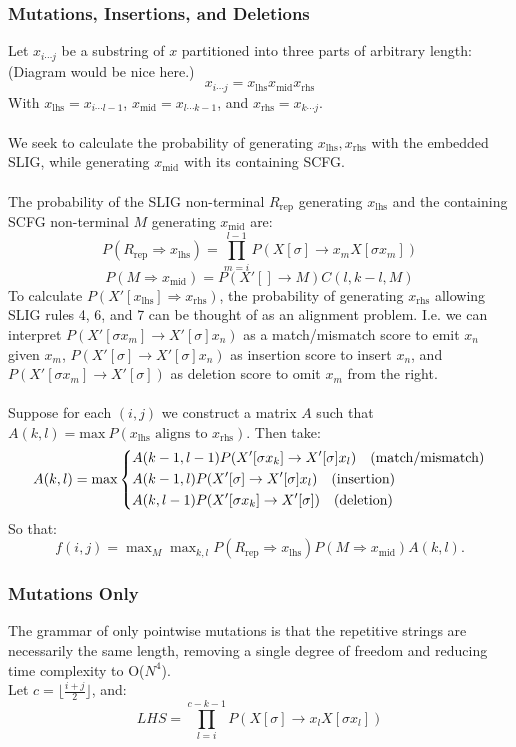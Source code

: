 \documentclass[11pt]{article}
\begin{document}
\subsubsection {Mutations, Insertions, and Deletions}
Let $x_{i \cdots j}$ be a substring of $x$ partitioned into three parts of arbitrary length: (Diagram would be nice here.)\\
\[
 x_{i \cdots j} = x_\text{lhs} x_\text{mid} x_\text{rhs}
\]
With $x_\text{lhs} = x_{i \cdots l-1}$, $x_\text{mid} = x_{l \cdots k-1}$, and $x_\text{rhs} = x_{k \cdots j}$.\\ \\
We seek to calculate the probability of generating $x_\text{lhs}, x_\text{rhs}$ with the embedded SLIG,
while generating $x_\text{mid}$ with its containing SCFG. \\ \\
The probability of the SLIG non-terminal $R_\text{rep}$ generating $x_\text{lhs}$ and the
containing SCFG non-terminal $M$ generating $x_\text{mid}$ are:
\[
 P(R_\text{rep} \Rightarrow x_\text{lhs}) = \prod_{m=i}^{l-1}P(X[\sigma] \rightarrow x_m X[\sigma x_m])
\]
\[
 P(M \Rightarrow x_\text{mid}) = P(X'[] \rightarrow M) C(l, k-l, M) 
\]
To calculate $P(X'[x_\text{lhs}] \Rightarrow x_\text{rhs})$, the probability of generating
$x_\text{rhs}$ allowing SLIG rules 4, 6, and 7 can be thought of as an alignment problem.
I.e. we can interpret $P(X'[\sigma x_m] \rightarrow X'[\sigma]x_n)$ as a match/mismatch score to
emit $x_n$ given $x_m$, $P(X'[\sigma] \rightarrow X'[\sigma]x_n)$ as insertion score to insert $x_n$,
and $P(X'[\sigma x_m] \rightarrow X'[\sigma])$ as deletion score to omit $x_m$ from the right. \\ \\
Suppose for each $(i, j)$ we construct a matrix $A$ such that $A(k, l) = \text{max} \ P(x_{\text{lhs}} \text{ aligns to } x_{\text{rhs}})$.
Then take:
\[
A(k, l) = \mbox{max}
  \begin{dcases}
  A(k-1, l-1) P(X'[\sigma x_k] \rightarrow X'[\sigma]x_l) \ \ \text{ (match/mismatch)}\\
  A(k-1, l) P(X'[\sigma] \rightarrow X'[\sigma]x_l) \ \ \text{ (insertion)}\\
  A(k, l-1) P(X'[\sigma x_k] \rightarrow X'[\sigma])  \ \ \text{ (deletion)}
  \end{dcases}
\]
So that:
\[
f(i, j) = \mathop{\mbox{max}}_{M} \mathop{\mbox{max}}_{k,l} P(R_\text{rep} \Rightarrow x_\text{lhs}) P(M \Rightarrow x_\text{mid}) A(k,l).
\]
\subsubsection {Mutations Only}
The grammar of only pointwise mutations is that the repetitive strings are
necessarily the same length, removing a single degree of freedom and reducing
time complexity to O($N^4$). \\
Let $c = \lfloor \frac{i + j}{2} \rfloor$, and:
\[
 LHS = \prod_{l=i}^{c-k-1}P(X[\sigma] \rightarrow x_l X[\sigma x_l])
\]
\end{document}
